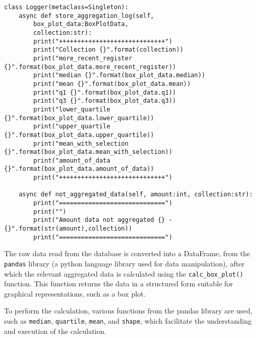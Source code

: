 \begin{verbatim}
class Logger(metaclass=Singleton):
    async def store_aggregation_log(self,
        box_plot_data:BoxPlotData,
        collection:str):
        print("+++++++++++++++++++++++++++++")
        print("Collection {}".format(collection))
        print("more_recent_register {}".format(box_plot_data.more_recent_register))
        print("median {}".format(box_plot_data.median))
        print("mean {}".format(box_plot_data.mean))
        print("q1 {}".format(box_plot_data.q1))
        print("q3 {}".format(box_plot_data.q3))
        print("lower_quartile {}".format(box_plot_data.lower_quartile))
        print("upper_quartile {}".format(box_plot_data.upper_quartile))
        print("mean_with_selection {}".format(box_plot_data.mean_with_selection))
        print("amount_of_data {}".format(box_plot_data.amount_of_data))
        print("+++++++++++++++++++++++++++++")

    async def not_aggregated_data(self, amount:int, collection:str):
        print("=============================")
        print("")
        print("Amount data not aggregated {} - {}".format(str(amount),collection))
        print("=============================")
\end{verbatim}

The raw data read from the database is converted into a DataFrame, from the \texttt{pandas} library \cite{pandasDocs} (a python language library used for data manipulation), after which the relevant aggregated data is calculated using the \texttt{calc\_box\_plot()} function. This function returns the data in a structured form suitable for graphical representations, such as a box plot.

To perform the calculation, various functions from the pandas library are used, such as \texttt{median}, \texttt{quartile}, \texttt{mean}, and \texttt{shape}, which facilitate the understanding and execution of the calculation.

